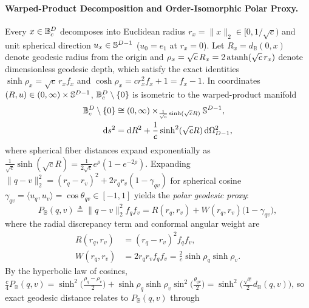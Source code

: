 \paragraph{Warped-Product Decomposition and Order-Isomorphic Polar Proxy.}
Every $x \in \mathbb{B}_c^D$ decomposes into Euclidean radius $r_x = \|x\|_2 \in [0, 1/\sqrt{c})$ and unit spherical direction $u_x \in \mathbb{S}^{D-1}$ ($u_0 = e_1$ at $r_x = 0$).
Let $R_x = d_{\mathbb{B}}(0, x)$ denote geodesic radius from the origin and $\rho_x = \sqrt{c}\,R_x = 2\operatorname{atanh}(\sqrt{c}\,r_x)$ denote dimensionless geodesic depth, which satisfy the exact identities $\sinh\rho_x = \sqrt{c}\,r_x f_x$ and $\cosh\rho_x = c r_x^2 f_x + 1 = f_x - 1$.
In coordinates $(R, u) \in (0, \infty) \times \mathbb{S}^{D-1}$, $\mathbb{B}_c^D \setminus \{0\}$ is isometric to the warped-product manifold
\begin{equation}
  \begin{aligned}
    \mathbb{B}_c^D \setminus \{0\} &\cong (0, \infty) \times_{\frac{1}{\sqrt{c}}\sinh(\sqrt{c}R)} \mathbb{S}^{D-1}, \\
    \mathrm{d}s^2 &= \mathrm{d}R^2 + \frac{1}{c}\sinh^2(\sqrt{c}R)\,\mathrm{d}\Omega_{D-1}^2,
  \end{aligned}
  \label{eq:warped_metric}
\end{equation}
where spherical fiber distances expand exponentially as $\frac{1}{\sqrt{c}}\sinh(\sqrt{c}R) = \frac{1}{2\sqrt{c}}e^{\rho}(1 - e^{-2\rho})$.
Expanding $\|q - v\|_2^2 = (r_q - r_v)^2 + 2 r_q r_v(1 - \gamma_{qv})$ for spherical cosine $\gamma_{qv} = \langle u_q, u_v\rangle = \cos\theta_{qv} \in [-1, 1]$ yields the \emph{polar geodesic proxy}:
\begin{equation}
  P_{\mathbb{B}}(q, v) \triangleq \|q - v\|_2^2 f_q f_v = R(r_q, r_v) + W(r_q, r_v)\bigl(1 - \gamma_{qv}\bigr),
  \label{eq:polar_proxy}
\end{equation}
where the radial discrepancy term and conformal angular weight are
\begin{equation}
  \begin{aligned}
    R(r_q, r_v) &= (r_q - r_v)^2 f_q f_v, \\
    W(r_q, r_v) &= 2 r_q r_v f_q f_v = \frac{2}{c}\sinh\rho_q \sinh\rho_v.
  \end{aligned}
  \label{eq:radial_conformal_weights}
\end{equation}
By the hyperbolic law of cosines, $\frac{c}{4}P_{\mathbb{B}}(q, v) = \sinh^2\!\bigl(\frac{\rho_q - \rho_v}{2}\bigr) + \sinh\rho_q\sinh\rho_v\sin^2\!\bigl(\frac{\theta_{qv}}{2}\bigr) = \sinh^2\!\bigl(\frac{\sqrt{c}}{2}d_{\mathbb{B}}(q, v)\bigr)$, so exact geodesic distance relates to $P_{\mathbb{B}}(q, v)$ through
